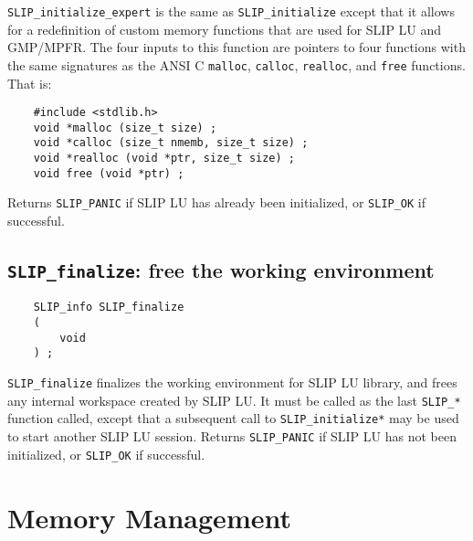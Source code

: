 \documentclass[12pt]{article}
\theoremstyle{definition}
\begin{document}
\verb|SLIP_initialize_expert| is the same as \verb|SLIP_initialize| except that
it allows for a redefinition of custom memory functions that are used for SLIP
LU and GMP/MPFR.  The four inputs to this function are pointers to four
functions with the same signatures as the ANSI C \verb'malloc', \verb'calloc',
\verb'realloc', and \verb'free' functions.  That is:

\begin{mdframed}[userdefinedwidth=6in]
{\footnotesize
\begin{verbatim}
    #include <stdlib.h>
    void *malloc (size_t size) ;
    void *calloc (size_t nmemb, size_t size) ;
    void *realloc (void *ptr, size_t size) ;
    void free (void *ptr) ;
\end{verbatim}
} \end{mdframed}

Returns \verb|SLIP_PANIC| if SLIP LU has already been initialized,
or \verb|SLIP_OK| if successful.

\cprotect\subsection{\verb|SLIP_finalize|: free the working environment}
\label{ss:SLIP_finalize}

\begin{mdframed}[userdefinedwidth=6in]
{\footnotesize
\begin{verbatim}
    SLIP_info SLIP_finalize
    (
        void
    ) ;
\end{verbatim}
} \end{mdframed}

\verb|SLIP_finalize| finalizes the working environment for SLIP LU
library, and frees any internal workspace created by SLIP LU.  It must be
called as the last \verb|SLIP_*| function called, except that a subsequent
call to \verb|SLIP_initialize*| may be used to start another SLIP LU session.
Returns \verb|SLIP_PANIC| if SLIP LU has not been initialized,
or \verb|SLIP_OK| if successful.

\section{Memory Management} \label{s:user:memmanag}
\end{document}
